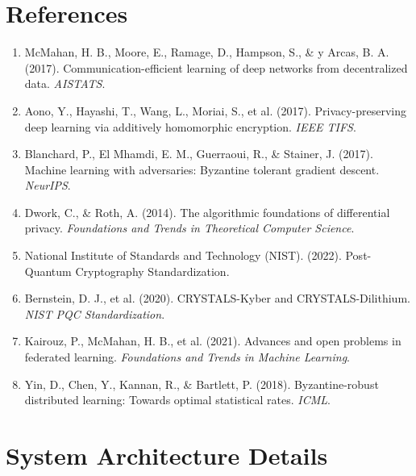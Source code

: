 \documentclass[12pt,a4paper]{article}
\begin{document}
\section*{References}

\begin{enumerate}
    \item McMahan, H. B., Moore, E., Ramage, D., Hampson, S., \& y Arcas, B. A. (2017). Communication-efficient learning of deep networks from decentralized data. \textit{AISTATS}.
    
    \item Aono, Y., Hayashi, T., Wang, L., Moriai, S., et al. (2017). Privacy-preserving deep learning via additively homomorphic encryption. \textit{IEEE TIFS}.
    
    \item Blanchard, P., El Mhamdi, E. M., Guerraoui, R., \& Stainer, J. (2017). Machine learning with adversaries: Byzantine tolerant gradient descent. \textit{NeurIPS}.
    
    \item Dwork, C., \& Roth, A. (2014). The algorithmic foundations of differential privacy. \textit{Foundations and Trends in Theoretical Computer Science}.
    
    \item National Institute of Standards and Technology (NIST). (2022). Post-Quantum Cryptography Standardization.
    
    \item Bernstein, D. J., et al. (2020). CRYSTALS-Kyber and CRYSTALS-Dilithium. \textit{NIST PQC Standardization}.
    
    \item Kairouz, P., McMahan, H. B., et al. (2021). Advances and open problems in federated learning. \textit{Foundations and Trends in Machine Learning}.
    
    \item Yin, D., Chen, Y., Kannan, R., \& Bartlett, P. (2018). Byzantine-robust distributed learning: Towards optimal statistical rates. \textit{ICML}.
\end{enumerate}

\newpage
\appendix

\section{System Architecture Details}
\label{appendix:architecture}
\end{document}

